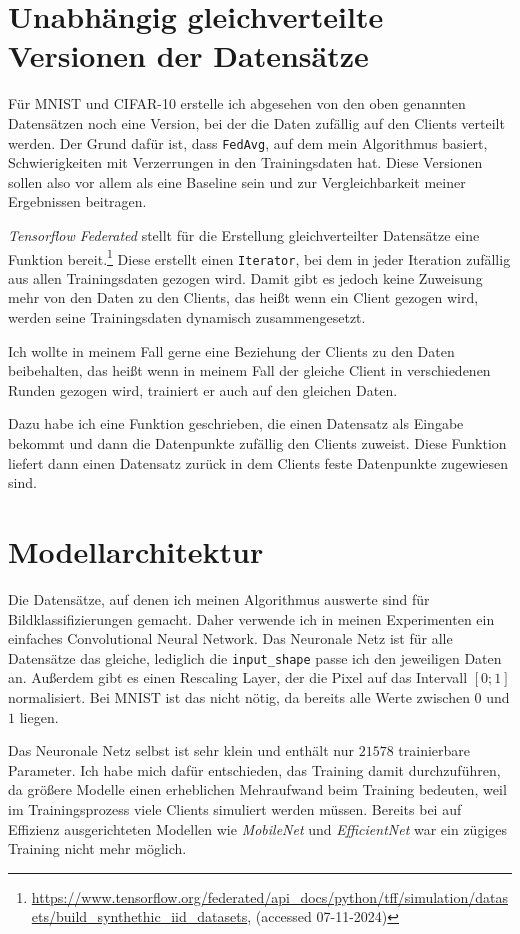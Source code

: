 \section{Unabhängig gleichverteilte Versionen der Datensätze}\label{sec:iid-dataset-creation}
Für MNIST und CIFAR-10 erstelle ich abgesehen von den oben genannten Datensätzen noch eine Version, bei der die Daten zufällig auf den Clients verteilt werden. Der Grund dafür ist, dass \texttt{FedAvg}, auf dem mein Algorithmus basiert, Schwierigkeiten mit Verzerrungen in den Trainingsdaten hat. Diese Versionen sollen also vor allem als eine Baseline sein und zur Vergleichbarkeit meiner Ergebnissen beitragen.

\textit{Tensorflow Federated} stellt für die Erstellung gleichverteilter Datensätze eine Funktion bereit.\footnote{\url{https://www.tensorflow.org/federated/api_docs/python/tff/simulation/datasets/build_synthethic_iid_datasets}, (accessed 07-11-2024)} Diese erstellt einen \texttt{Iterator}, bei dem in jeder Iteration zufällig aus allen Trainingsdaten gezogen wird. Damit gibt es jedoch keine Zuweisung mehr von den Daten zu den Clients, das heißt wenn ein Client gezogen wird, werden seine Trainingsdaten dynamisch zusammengesetzt.

Ich wollte in meinem Fall gerne eine Beziehung der Clients zu den Daten beibehalten, das heißt wenn in meinem Fall der gleiche Client in verschiedenen Runden gezogen wird, trainiert er auch auf den gleichen Daten.

Dazu habe ich eine Funktion geschrieben, die einen Datensatz als Eingabe bekommt und dann die Datenpunkte zufällig den Clients zuweist. Diese Funktion liefert dann einen Datensatz zurück in dem Clients feste Datenpunkte zugewiesen sind.

\section{Modellarchitektur}
Die Datensätze, auf denen ich meinen Algorithmus auswerte sind für Bildklassifizierungen gemacht. Daher verwende ich in meinen Experimenten ein einfaches Convolutional Neural Network. Das Neuronale Netz ist für alle Datensätze das gleiche, lediglich die \texttt{input\_shape} passe ich den jeweiligen Daten an. Außerdem gibt es einen Rescaling Layer, der die Pixel auf das Intervall $[0;1]$ normalisiert. Bei MNIST ist das nicht nötig, da bereits alle Werte zwischen $0$ und $1$ liegen.

Das Neuronale Netz selbst ist sehr klein und enthält nur $21578$ trainierbare Parameter. Ich habe mich dafür entschieden, das Training damit durchzuführen, da größere Modelle einen erheblichen Mehraufwand beim Training bedeuten, weil im Trainingsprozess viele Clients simuliert werden müssen. Bereits bei auf Effizienz ausgerichteten Modellen wie \textit{MobileNet} \cite{howard:2017} und \textit{EfficientNet} \cite{tan:2019} war ein zügiges Training nicht mehr möglich.

